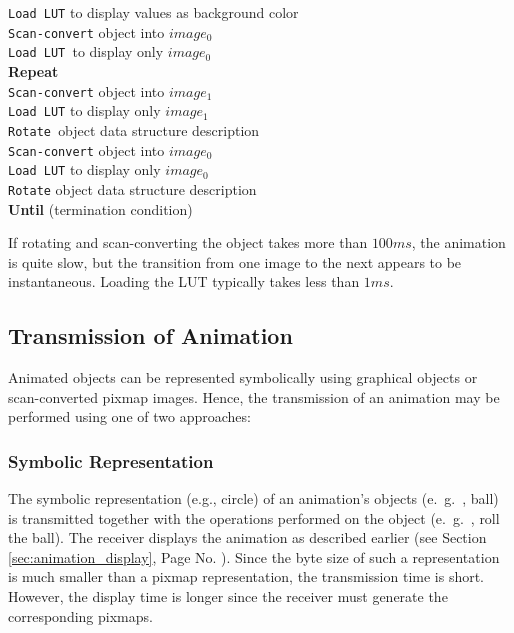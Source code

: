   \begin{algorithm}[H]
  	 \texttt{Load LUT} to display values as background color \\
  	 \texttt{Scan-convert} object into $ image_0 $ \\
  	 \texttt{Load LUT }to display only $ image_0 $ \\
  	\textbf{Repeat} \\
  	
  \Indp 
  	\texttt{Scan-convert} object into $ image_1 $\\
  	\texttt{Load LUT} to display only $ image_1 $\\
  	\texttt{Rotate }object data structure description\\
  	\texttt{Scan-convert} object into $ image_0 $\\
  	\texttt{Load LUT} to display only $ image_0 $\\
  	\texttt{Rotate} object data structure description\\
  \Indm\textbf{Until} (termination condition)\\
\end{algorithm}

If rotating and scan-converting the object takes more than $ 100ms $, the animation is quite slow, but the transition from one image to the next appears to be instantaneous. Loading the LUT typically takes less than $ 1ms $.


\subsection{Transmission of Animation}
Animated objects can be represented symbolically using graphical objects or scan-converted pixmap images. Hence, the transmission of an animation may be performed using one of two approaches:

\subsubsection{Symbolic Representation}
The symbolic representation (e.g., circle) of an animation’s objects (e.\ g.\ , ball) is transmitted together with the operations performed on the object (e.\ g.\ , roll the ball). The receiver displays the animation as described earlier (see Section \ref{sec:animation_display}, Page No. \pageref{sec:animation_display}). Since the byte size of such a representation is much smaller than a pixmap representation, the transmission time is short. However, the display time is longer since the receiver must generate the corresponding pixmaps.

